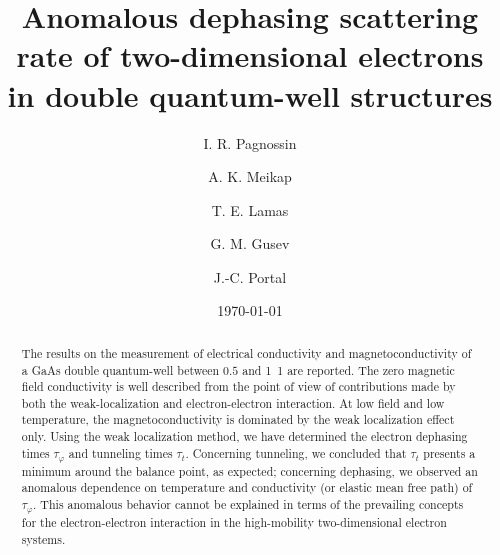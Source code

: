 \documentclass[prb,showpacs,showkeys,twocolumn]{revtex4}
\newcommand{\ttau}   {\ensuremath{\tau_t}}
\newcommand{\tauphi} {\ensuremath{\tau_\varphi}}
\begin{document}
	\title{Anomalous dephasing scattering rate of two-dimensional electrons
	in double quantum-well structures}
	
	\author{I. R. Pagnossin}
	
	\author{A. K. Meikap}
	
	\author{T. E. Lamas}
	\author{G. M. Gusev}
		
	\author{J.-C. Portal}
	
	\date{\today}

\begin{abstract}

	The results on the measurement of electrical conductivity and	magnetoconductivity of a GaAs double quantum-well between $0.5$ and \unit{1.1}{\kelvin} are reported. The zero magnetic field conductivity is	well described from	the point of view of contributions made by both the weak-localization and	electron-electron interaction. At low field and low temperature, the magnetoconductivity is dominated by the weak localization effect only. Using the weak localization method, we have determined the electron dephasing times $\tauphi$ and tunneling times $\ttau$. Concerning tunneling, we concluded that $\tau_t$ presents a minimum around the balance point, as expected; concerning dephasing, we observed an anomalous dependence on temperature and conductivity (or elastic mean free path) of $\tauphi$. This anomalous behavior cannot be explained in terms of the prevailing concepts for the electron-electron interaction in the high-mobility two-dimensional electron systems.
	
\end{abstract}

\end{document}
